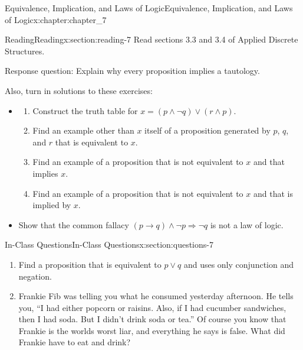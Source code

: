 \documentclass[oneside,10pt,]{book}
\numberwithin{equation}{section}
\begin{document}
\begin{chapterptx}{Equivalence, Implication, and Laws of Logic}{}{Equivalence, Implication, and Laws of Logic}{}{}{x:chapter:chapter_7}
%
%
%
%
%
\typeout{************************************************}
\typeout{************************************************}
%
\begin{sectionptx}{Reading}{}{Reading}{}{}{x:section:reading-7}
Read sections 3.3 and 3.4 of Applied Discrete Structures.%
\par
Response question: Explain why every proposition implies a tautology.%
\par
Also, turn in solutions to these exercises:%
\begin{itemize}[label=\textbullet]
\item{}%
\begin{enumerate}[label=(\alph*)]
\item{}Construct the truth table for \(x= (p \land  \neg q) \lor  (r \land  p)\).%
\item{}Find an example other than \(x\) itself of a proposition generated by \(p\), \(q\), and \(r\) that is equivalent to \(x\).%
\item{}Find an example of a proposition that is not equivalent to \(x\) and that implies \(x\).%
\item{}Find an example of a proposition that is not equivalent to \(x\) and that is implied by \(x\).%
\end{enumerate}
%
\item{}Show that the common fallacy \((p\to  q) \land  \neg p \Rightarrow  \neg q\) is not a law of logic.%
\end{itemize}
%
\end{sectionptx}
%
%
\typeout{************************************************}
\typeout{************************************************}
%
\begin{sectionptx}{In-Class Questions}{}{In-Class Questions}{}{}{x:section:questions-7}
%
\begin{enumerate}[label=\arabic*.]
\item{}Find a proposition that is equivalent to \(p \lor  q\) and uses only conjunction and negation.%
\item{}Frankie Fib was telling you what he consumed yesterday afternoon. He tells you, ``I had either popcorn or raisins. Also, if I had cucumber sandwiches, then I had soda. But I didn't drink soda or tea.'' Of course you know that Frankie is the worlds worst liar, and everything he says is false. What did Frankie have to eat and drink?%

\end{enumerate}
\end{sectionptx}
\end{chapterptx}
\end{document}
